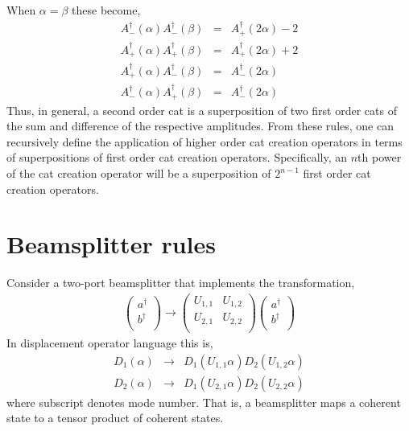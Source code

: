 \documentclass[aps,prl,twocolumn,amsmath,amssymb,nofootinbib,superscriptaddress]{revtex4}
\begin{document}
When $\alpha=\beta$ these become,
\begin{eqnarray}
A^\dag_-(\alpha)A^\dag_-(\beta) &=& A^\dag_+(2\alpha) - 2 \\
A^\dag_+(\alpha)A^\dag_+(\beta) &=& A^\dag_+(2\alpha) + 2 \\
A^\dag_+(\alpha)A^\dag_-(\beta) &=& A^\dag_-(2\alpha) \\
A^\dag_-(\alpha)A^\dag_+(\beta) &=& A^\dag_-(2\alpha)
\end{eqnarray}
Thus, in general, a second order cat is a superposition of two first order cats of the sum and difference of the respective amplitudes. From these rules, one can recursively define the application of higher order cat creation operators in terms of superpositions of first order cat creation operators. Specifically, an $n$th power of the cat creation operator will be a superposition of $2^{n-1}$ first order cat creation operators.

\section{Beamsplitter rules}

Consider a two-port beamsplitter that implements the transformation,
\begin{eqnarray}
\left( \begin{array}{c}
a^\dag \\
b^\dag \\
\end{array} \right)
\to \left( \begin{array}{cc}
U_{1,1} & U_{1,2} \\
U_{2,1} & U_{2,2} \\
\end{array} \right)
\left( \begin{array}{c}
a^\dag \\
b^\dag \\
\end{array} \right)
\end{eqnarray}
In displacement operator language this is,
\begin{eqnarray}
D_1(\alpha) &\to& D_1(U_{1,1} \alpha) D_2(U_{1,2} \alpha) \nonumber \\
D_2(\alpha) &\to& D_1(U_{2,1} \alpha) D_2(U_{2,2} \alpha)
\end{eqnarray}
where subscript denotes mode number. That is, a beamsplitter maps a coherent state to a tensor product of coherent states.
\end{document}
